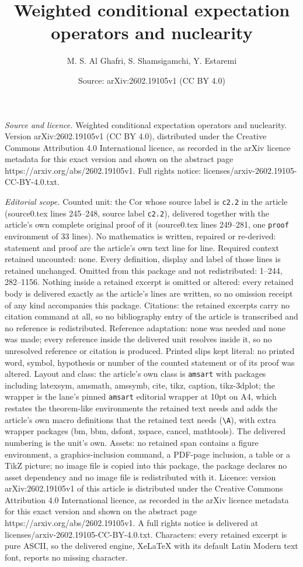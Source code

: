 \documentclass[10pt,a4paper]{amsart}
\title[Weighted conditional expectation operators and nuclearity]{Weighted conditional expectation operators and nuclearity}
\author{M. S. Al Ghafri, S. Shamsigamchi, Y. Estaremi}
\date{Source: arXiv:2602.19105v1 (CC BY 4.0)}
\begin{document}
\maketitle

\noindent\emph{Source and licence.} Weighted conditional expectation operators and nuclearity. Version arXiv:2602.19105v1 (CC BY 4.0), distributed under the Creative Commons Attribution 4.0 International licence, as recorded in the arXiv licence metadata for this exact version and shown on the abstract page https://arxiv.org/abs/2602.19105v1. Full rights notice: licenses/arxiv-2602.19105-CC-BY-4.0.txt.\par\smallskip

\noindent\textit{Editorial scope.} Counted unit: the Cor whose source label is \texttt{c2.2} in the article (source0.tex lines 245--248, source label \texttt{c2.2}), delivered together with the article's own complete original proof of it (source0.tex lines 249--281, one \texttt{proof} environment of 33 lines). No mathematics is written, repaired or re-derived: statement and proof are the article's own text line for line. Required context retained uncounted: none. Every definition, display and label of those lines is retained unchanged. Omitted from this package and not redistributed: 1--244, 282--1156. Nothing inside a retained excerpt is omitted or altered: every retained body is delivered exactly as the article's lines are written, so no omission receipt of any kind accompanies this package. Citations: the retained excerpts carry no citation command at all, so no bibliography entry of the article is transcribed and no reference is redistributed. Reference adaptation: none was needed and none was made; every reference inside the delivered unit resolves inside it, so no unresolved reference or citation is produced. Printed slips kept literal: no printed word, symbol, hypothesis or number of the counted statement or of its proof was altered. Layout and class: the article's own class is \texttt{amsart} with packages including latexsym, amsmath, amssymb, cite, tikz, caption, tikz-3dplot; the wrapper is the lane's pinned \texttt{amsart} editorial wrapper at 10pt on A4, which restates the theorem-like environments the retained text needs and adds the article's own macro definitions that the retained text needs (\texttt{\textbackslash A}), with extra wrapper packages (bm, bbm, dsfont, xspace, cancel, mathtools). The delivered numbering is the unit's own. Assets: no retained span contains a figure environment, a graphics-inclusion command, a PDF-page inclusion, a table or a TikZ picture; no image file is copied into this package, the package declares no asset dependency and no image file is redistributed with it. Licence: version arXiv:2602.19105v1 of this article is distributed under the Creative Commons Attribution 4.0 International licence, as recorded in the arXiv licence metadata for this exact version and shown on the abstract page https://arxiv.org/abs/2602.19105v1. A full rights notice is delivered at licenses/arxiv-2602.19105-CC-BY-4.0.txt. Characters: every retained excerpt is pure ASCII, so the delivered engine, XeLaTeX with its default Latin Modern text font, reports no missing character.
\end{document}
